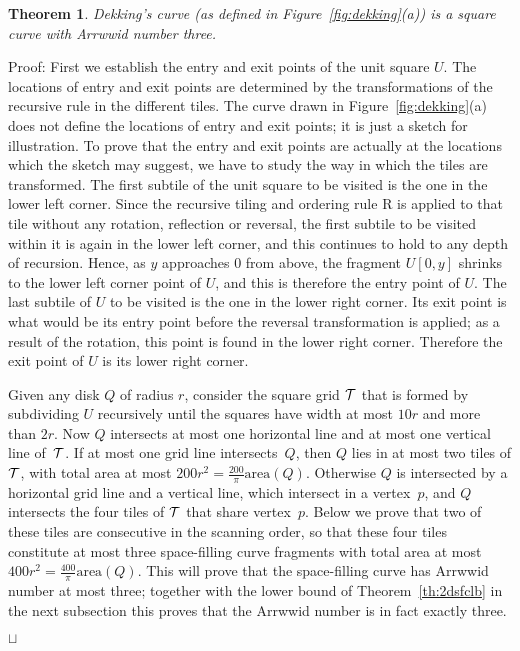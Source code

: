 \documentclass[11pt,a4paper]{article}
\newcommand{\area}{\mathrm{area}}
\newcommand{\unittile}{\ensuremath{U}\xspace}
\newtheorem{theorem}{Theorem}
\newenvironment{proof}{Proof:}{\qed}
\def\squareforqed{\hbox{\rlap{$\sqcap$}$\sqcup$}}
\def\qed{\ifmmode\squareforqed\else{\unskip\nobreak\hfil
\penalty50\hskip1em\null\nobreak\hfil\squareforqed
\parfillskip=0pt\finalhyphendemerits=0\endgraf}\fi}
\begin{document}
\begin{theorem}\label{th:dekking}
Dekking's curve (as defined in Figure~\ref{fig:dekking}(a)) is a square curve with Arrwwid number three.
\end{theorem}
\begin{proof}
First we establish the entry and exit points of the unit square \unittile. The locations of entry and exit points are determined by the transformations of the recursive rule in the different tiles. The curve drawn in Figure~\ref{fig:dekking}(a) does not define the locations of entry and exit points; it is just a sketch for illustration. To prove that the entry and exit points are actually at the locations which the sketch may suggest, we have to study the way in which the tiles are transformed. The first subtile of the unit square to be visited is the one in the lower left corner. Since the recursive tiling and ordering rule \textsf{R} is applied to that tile without any rotation, reflection or reversal, the first subtile to be visited within it is again in the lower left corner, and this continues to hold to any depth of recursion. Hence, as $y$ approaches 0 from above, the fragment $\unittile[0,y]$ shrinks to the lower left corner point of \unittile, and this is therefore the entry point of \unittile. The last subtile of \unittile to be visited is the one in the lower right corner. Its exit point is what would be its entry point before the reversal transformation is applied; as a result of the rotation, this point is found in the lower right corner. Therefore the exit point of \unittile is its lower right corner.

Given any disk $Q$ of radius $r$, consider the square grid ${\cal T}$ that is formed by subdividing \unittile recursively until the squares have width at most $10r$ and more than $2r$. Now $Q$ intersects at most one horizontal line and at most one vertical line of~${\cal T}$. If at most one grid line intersects~$Q$, then $Q$ lies in at most two tiles of ${\cal T}$, with total area at most $200r^2 = \frac{200}\pi \area(Q)$. Otherwise $Q$ is intersected by a horizontal grid line and a vertical line, which intersect in a vertex~$p$, and $Q$ intersects the four tiles of ${\cal T}$ that share vertex~$p$. Below we prove that two of these tiles are consecutive in the scanning order, so that these four tiles constitute at most three space-filling curve fragments with total area at most $400r^2 = \frac{400}\pi \area(Q)$. This will prove that the space-filling curve has Arrwwid number at most three; together with the lower bound of Theorem~\ref{th:2dsfclb} in the next subsection this proves that the Arrwwid number is in fact exactly three.


\end{proof}
\end{document}
